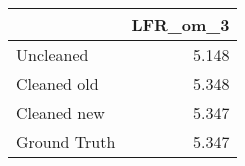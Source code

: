 \begin{tabular}{lr}
\toprule
{} & LFR_om_3 \\
\midrule
Uncleaned    &    5.148 \\
Cleaned old  &    5.348 \\
Cleaned new  &    5.347 \\
Ground Truth &    5.347 \\
\bottomrule
\end{tabular}
